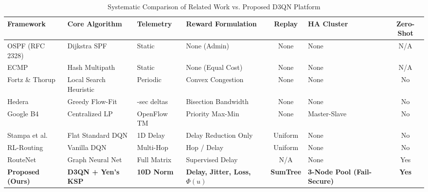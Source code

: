 \documentclass[12pt,a4paper,oneside]{report}
\begin{document}
\begin{table}[htbp]
\centering
\caption{Systematic Comparison of Related Work vs. Proposed D3QN Platform}
\label{tab:related_work}
\scriptsize
\begin{tabularx}{\textwidth}{l >{\raggedright\arraybackslash}p{2.2cm} >{\centering\arraybackslash}p{1.6cm} >{\raggedright\arraybackslash}X c >{\centering\arraybackslash}p{2.2cm} c}
\toprule
\textbf{Framework} & \textbf{Core Algorithm} & \textbf{Telemetry} & \textbf{Reward Formulation} & \textbf{Replay} & \textbf{HA Cluster} & \textbf{Zero-Shot} \\
\midrule
OSPF (RFC 2328) \cite{moy1998ospf} & Dijkstra SPF & Static & None (Admin) & None & None & N/A \\
ECMP \cite{moy1998ospf} & Hash Multipath & Static & None (Equal Cost) & None & None & N/A \\
Fortz \& Thorup \cite{fortz2000internet} & Local Search Heuristic & Periodic & Convex Congestion & None & None & No \\
Hedera \cite{al2010hedera} & Greedy Flow-Fit & 5-sec deltas & Bisection Bandwidth & None & None & No \\
Google B4 \cite{jain2013b4} & Centralized LP & OpenFlow TM & Priority Max-Min & None & Master-Slave & No \\
Stampa et al. \cite{stampa2017deep} & Flat Standard DQN & 1D Delay & Delay Reduction Only & Uniform & None & No \\
RL-Routing \cite{chen2020rlrouting} & Vanilla DQN & Multi-Hop & Hop / Delay & Uniform & None & No \\
RouteNet \cite{rusek2019routenet} & Graph Neural Net & Full Matrix & Supervised Delay & N/A & None & Yes \\
\textbf{Proposed (Ours)} & \textbf{D3QN + Yen's KSP} & \textbf{10D Norm} & \textbf{Delay, Jitter, Loss, $\Phi(u)$} & \textbf{SumTree} & \textbf{3-Node Pool (Fail-Secure)} & \textbf{Yes} \\
\bottomrule
\end{tabularx}
\end{table}
\end{document}

